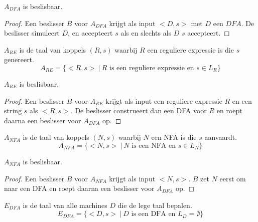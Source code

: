 \documentclass[main.tex]{subfiles}
\begin{document}
\begin{st}
  \label{st:a-dfa-besl}
  $A_{DFA}$ is beslisbaar.

  \begin{proof}
    Een beslisser $B$ voor $A_{DFA}$ krijgt als input $<D,s>$ met $D$ een $DFA$.
    De beslisser simuleert $D$, en accepteert $s$ als en slechts als $D$ $s$ accepteert.
  \end{proof}
\end{st}

\begin{de}
  \label{de:a-re}
  $A_{RE}$ is de taal van koppels $(R,s)$ waarbij $R$ een reguliere expressie is die $s$ genereert.
  \[ A_{RE} = \{ <R,s> \ |\ R \text{ is een reguliere expressie en } s \in L_{R} \} \]
\end{de}

\begin{st}
  \label{st:a-re-besl}
  $A_{RE}$ is beslisbaar.

  \begin{proof}
    Een beslisser $B$ voor $A_{RE}$ krijgt als input een reguliere expressie $R$ en een string $s$ als $<R,s>$.
    De beslisser construeert dan een DFA voor $R$ en roept daarna een beslisser voor $A_{DFA}$ op.
  \end{proof}
\end{st}

\begin{de}
  \label{de:a-nfa}
  $A_{NFA}$ is de taal van koppels $(N,s)$ waarbij $N$ een NFA is die $s$ aanvaardt.
  \[ A_{NFA} = \{ <N,s> \ |\ N \text{ is een NFA en } s \in L_{N} \} \]
\end{de}

\begin{st}
  \label{st-a-nfa-besl}
  $A_{NFA}$ is beslisbaar.

  \begin{proof}
    Een beslisser $B$ voor $A_{NFA}$ krijgt als input $<N,s>$.
    $B$ zet $N$ eerst om naar een DFA en roept daarna een beslisser voor $A_{DFA}$ op.
  \end{proof}
\end{st}


\begin{de}
  \label{de:e-dfa}
  $E_{DFA}$ is de taal van alle machines $D$ die de lege taal bepalen.
  \[ E_{DFA} = \{ <D,s>\ |\ D \text{ is een DFA en } L_{D} = \emptyset \} \]
\end{de}
\end{document}
